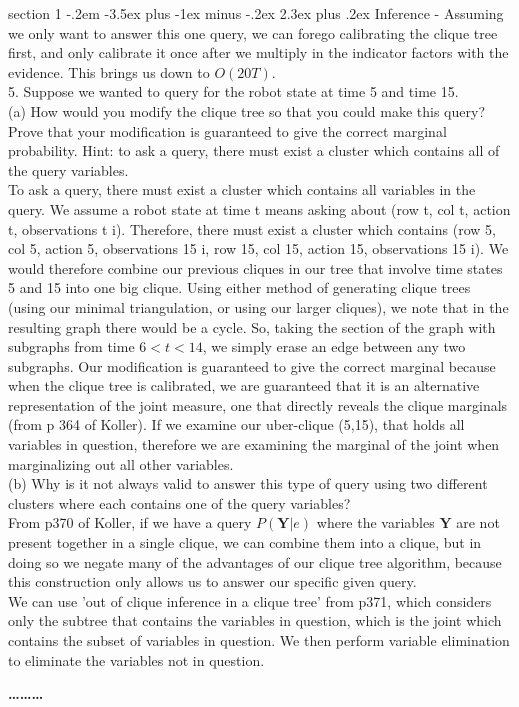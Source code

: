 \documentclass[12pt]{article}
\makeatletter
\newenvironment{problem}{\@startsection
       {section}
       {1}
       {-.2em}
       {-3.5ex plus -1ex minus -.2ex}
       {2.3ex plus .2ex}
       {\pagebreak[3]%
       \large\bf\noindent{Problem }
       }
       }
       {%
       \begin{center}\large\bf \ldots\ldots\ldots\end{center}}
\makeatother
\begin{document}
\begin{problem}{Inference}
\noindent - Assuming we only want to answer this one query, we can forego calibrating the clique tree first, and only calibrate it once after we multiply in the indicator factors with the evidence.  This brings us down to $O(20T)$.\\

5. Suppose we wanted to query for the robot state at time 5 and time 15.\\
(a) How would you modify the clique tree so that you could make this query?
Prove that your modification is guaranteed to give the correct marginal probability.
Hint: to ask a query, there must exist a cluster which contains all of the query variables.\\
To ask a query, there must exist a cluster which contains all variables in the query.  We assume a robot state at time t means asking about (row t, col t, action t, observations t i).  Therefore, there must exist a cluster which contains (row 5, col 5, action 5, observations 15 i, row 15, col 15, action 15, observations 15 i).  We would therefore combine our previous cliques in our tree that involve time states 5 and 15 into one big clique.  Using either method of generating clique trees (using our minimal triangulation, or using our larger cliques), we note that in the resulting graph there would be a cycle.  So, taking the section of the graph with subgraphs from time $6 < t < 14$, we simply erase an edge between any two subgraphs.  Our modification is guaranteed to give the correct marginal because when the clique tree is calibrated, we are guaranteed that it is an alternative representation of the joint measure, one that directly reveals the clique marginals (from p 364 of Koller).  If we examine our uber-clique (5,15), that holds all variables in question, therefore we are examining the marginal of the joint when marginalizing out all other variables.\\
(b) Why is it not always valid to answer this type of query using two different clusters where each contains one of the query variables? \\
From p370 of Koller, if we have a query $P(\textbf{Y} | e)$ where the variables $\textbf{Y}$ are not present together in a single clique, we can combine them into a clique, but in doing so we negate many of the advantages of our clique tree algorithm, because this construction only allows us to answer our specific given query.\\
We can use 'out of clique inference in a clique tree' from p371, which considers only the subtree that contains the variables in question, which is the joint which contains the subset of variables in question.  We then perform variable elimination to eliminate the variables not in question.\\

\end{problem}
\end{document}
